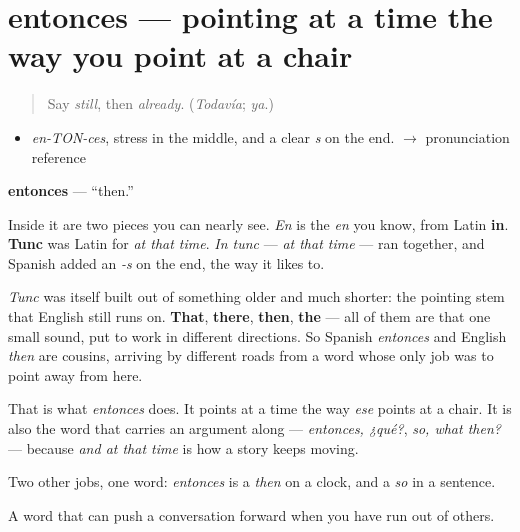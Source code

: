 \section[entonces]{entonces — pointing at a time the way you point at a chair}

\label{lesson:ES-C323-entonces}



\begin{quote}
Say \emph{still}, then \emph{already}. (\emph{Todavía}; \emph{ya}.)
\end{quote}

\begin{sounds}
\begin{itemize}
\raggedright
  \item \emph{en-TON-ces}, stress in the middle, and a clear \emph{s} on the end. $\to$ pronunciation reference
\end{itemize}
\end{sounds}

\begin{cousinweb}
\textbf{entonces} — \textquotedblleft{}then.\textquotedblright{}

Inside it are two pieces you can nearly see. \emph{En} is the \emph{en} you know, from Latin \textbf{in}. \textbf{Tunc} was Latin for \emph{at that time}. \emph{In tunc} — \emph{at that time} — ran together, and Spanish added an \emph{-s} on the end, the way it likes to.

\emph{Tunc} was itself built out of something older and much shorter: the pointing stem that English still runs on. \textbf{That}, \textbf{there}, \textbf{then}, \textbf{the} — all of them are that one small sound, put to work in different directions. So Spanish \emph{entonces} and English \emph{then} are cousins, arriving by different roads from a word whose only job was to point away from here.

That is what \emph{entonces} does. It points at a time the way \emph{ese} points at a chair. It is also the word that carries an argument along — \emph{entonces, ¿qué?}, \emph{so, what then?} — because \emph{and at that time} is how a story keeps moving.

Two other jobs, one word: \emph{entonces} is a \emph{then} on a clock, and a \emph{so} in a sentence.
\end{cousinweb}

\begin{grammarlens}[title={What you've built}]
A word that can push a conversation forward when you have run out of others.
\end{grammarlens}

